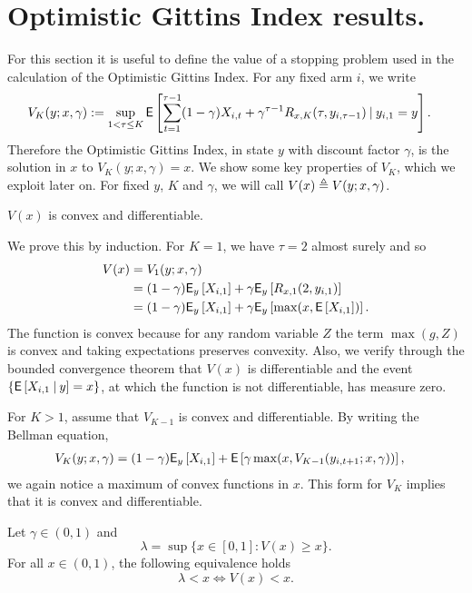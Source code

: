 \section{Optimistic Gittins Index results.} \label{sec:amgi_results}
For this section it is useful to define the value of a stopping problem used in the calculation of the Optimistic Gittins Index. For any fixed arm $i$, we write
\begin{align*}
V_K(y; x, \gamma) & := \sup_{1 < \tau \le K} \mathsf{E} \left[ \sum_{t=1}^{\tau-1} (1-\gamma)X_{i,t} + \gamma^{\tau-1} R_{x, K}(\tau, y_{i,\tau-1})	\:\vert\: y_{i,1} = y \right].
\end{align*}
Therefore the Optimistic Gittins Index, in state $y$ with discount factor $\gamma$, is the solution in $x$ to $V_K(y; x, \gamma) = x$. We show some key properties of $V_K$, which we exploit later on. For fixed $y$, $K$ and $\gamma$, we will call $V(x) \triangleq V(y; x, \gamma)$.
\begin{fact}
	$V(x)$ is convex and differentiable.
\end{fact}
\begin{myproof}[Proof.]
	We prove this by induction. For $K = 1$, we have $\tau = 2$ almost surely and so
	\begin{align*}
	V(x) & = V_1(y; x, \gamma) \\
	& = (1-\gamma)\mathsf{E}_y\left[X_{i,1}\right] + \gamma \mathsf{E}_y\left[R_{x, 1}(2, y_{i,1})\right] \\
	& = (1-\gamma)\mathsf{E}_y\left[X_{i,1} \right] + \gamma \mathsf{E}_y\left[\max(x, \mathsf{E} \left[ X_{i,1} \right])\right].
	\end{align*}
	The function is convex because for any random variable $Z$ the term $\max(g, Z)$ is convex and taking expectations preserves convexity. Also, we verify through the bounded convergence theorem that $V(x)$ is differentiable and the event $\{\mathsf{E}\left[ X_{i,1}\:\vert\: y\right]= x\}$, at which the function is not differentiable, has measure zero.
	
	For $K > 1$, assume that $V_{K-1}$ is convex and differentiable. By writing the Bellman equation,
	\begin{align*}
		V_K(y; x, \gamma) & = (1-\gamma)\mathsf{E}_y\left[X_{i,1}\right] + \mathsf{E}\left[\gamma \max(x, V_{K-1}(y_{i,t+1}; x, \gamma)) \right],
	\end{align*}
	we again notice a maximum of convex functions in $x$. This form for $V_K$ implies that it is convex and differentiable.
\end{myproof}
\begin{lemma} \label{eq:important_fact}
	Let $\gamma \in (0,1)$ and
	\begin{equation} \label{eq:def_lambda_in_important_equiv}
	\lambda = \sup\{ x \in [0,1] : V(x) \ge x\}.
	\end{equation} 
	For all $x \in (0,1)$, the following equivalence holds
	\begin{equation} \label{eq:equivlance_lambda1}
	\lambda < x  \Longleftrightarrow V(x) < x.
	\end{equation}
\end{lemma}
